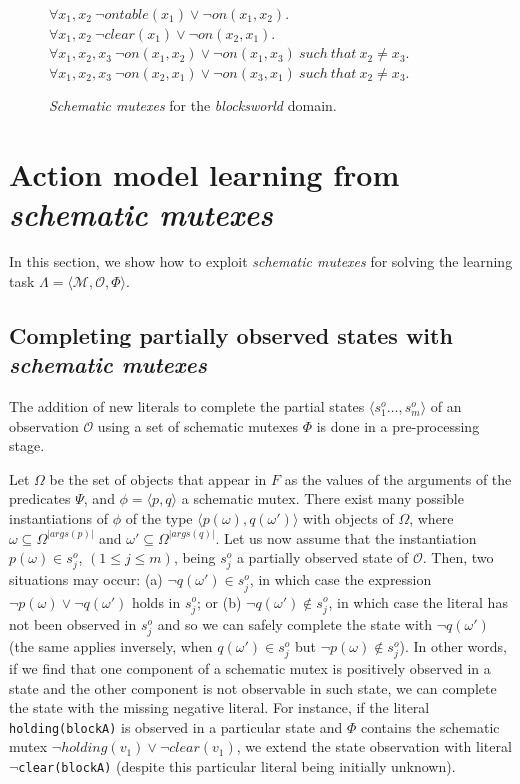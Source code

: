 \documentclass{article}
\newcommand{\tup}[1]{{\langle #1 \rangle}}
\begin{document}
\begin{figure}[hbt!]
  \begin{footnotesize}
$\forall x_1,x_2\ \neg ontable(x_1)\vee\neg on(x_1,x_2)$.\\
$\forall x_1,x_2\ \neg clear(x_1)\vee\neg on(x_2,x_1)$.\\
$\forall x_1,x_2,x_3\ \neg on(x_1,x_2)\vee\neg on(x_1,x_3)\ such\ that\ x_2\neq x_3$.\\
$\forall x_1,x_2,x_3\ \neg on(x_2,x_1)\vee\neg on(x_3,x_1)\ such\ that\ x_2\neq x_3$.\\
\end{footnotesize}
 \caption{\small {\em Schematic mutexes} for the {\em blocksworld} domain.}
\label{fig:strongest-invariant}
\end{figure}


\section{Action model learning from {\em schematic mutexes}}
\label{sec:compilation}

In this section, we show how to exploit \emph{schematic mutexes} for solving the learning task $\Lambda=\tup{\mathcal{M},{\mathcal O},\Phi}$.


\subsection{Completing partially observed states with {\em schematic mutexes}}

The addition of new literals to complete the partial states $\tup{s_1^o \ldots, s_m^o}$ of an observation $\mathcal{O}$  using a set of schematic mutexes $\Phi$ is done in a pre-processing stage.

Let $\Omega$ be the set of objects that appear in $F$ as the values of the arguments of the predicates $\Psi$, and $\phi=\tup{p,q}$ a schematic mutex. There exist many possible instantiations of $\phi$ of the type $\tup{p(\omega),q(\omega')}$ with objects of $\Omega$, where $\omega\subseteq\Omega^{|args(p)|}$ and $\omega'\subseteq\Omega^{|args(q)|}$. Let us now assume that the instantiation $p(\omega) \in s_j^o$, {\small $(1\leq j\leq m)$}, being $s_j^o$ a partially observed state of $\mathcal{O}$. Then, two situations may occur: (a) $\neg q(\omega') \in s_j^o$, in which case the expression $\neg p(\omega) \vee \neg q(\omega')$ holds in $s_j^o$; or (b) $\neg q(\omega') \notin s_j^o$, in which case the literal has not been observed in $s_j^o$ and so we can safely complete the state with $\neg q(\omega')$ (the same applies inversely, when $q(\omega') \in s_j^o$ but $\neg p(\omega) \notin s_j^o$). In other words, if we find that one component of a schematic mutex is positively observed in a state and the other component is not observable in such state, we can complete the state with the missing negative literal. For instance, if the literal {\tt\small holding(blockA)} is observed in a particular state and $\Phi$ contains the schematic mutex $\neg holding(v_1)\vee\neg clear(v_1)$, we extend the state observation with literal {\tt\small $\neg$clear(blockA)} (despite this particular literal being initially unknown).
\end{document}
